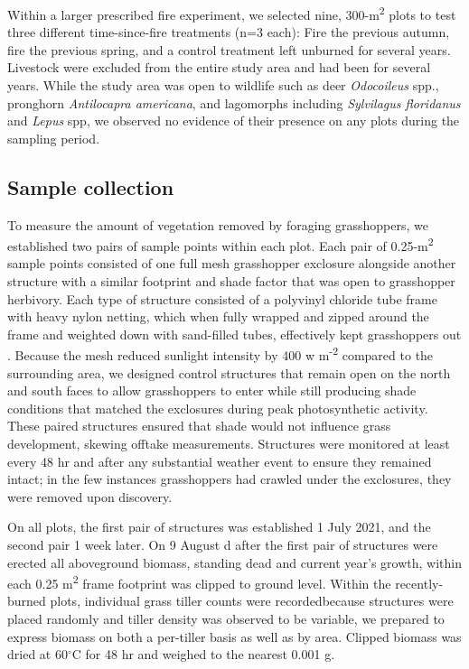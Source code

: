 \documentclass[referee, 
	            sn-basic]
           {sn-jnl}
\begin{document}
\begin{linenumbers}
Within a larger prescribed fire experiment, we selected nine, 300-m\textsuperscript{2} plots to test three different time-since-fire treatments (n=3 each): Fire the previous autumn, fire the previous spring, and a control treatment left unburned for several years. 
Livestock were excluded from the entire study area and had been for several years.
While the study area was open to wildlife such as deer \emph{Odocoileus} spp., pronghorn \emph{Antilocapra americana}, and lagomorphs including \emph{Sylvilagus floridanus} and \emph{Lepus} spp, we observed no evidence of their presence on any plots during the sampling period. 

\subsection{Sample collection}

To measure the amount of vegetation removed by foraging grasshoppers, we established two pairs of sample points within each plot. 
Each pair of 0.25-m\textsuperscript{2} sample points consisted of one full mesh grasshopper exclosure alongside another structure with a similar footprint and shade factor that was open to grasshopper herbivory.
Each type of structure consisted of a polyvinyl chloride tube frame with heavy nylon netting, which when fully wrapped and zipped around the frame and weighted down with sand-filled tubes, effectively kept grasshoppers out \citep{parker1985}. 
Because the mesh reduced sunlight intensity by 400 w m\textsuperscript{-2} compared to the
surrounding area, we designed control structures that remain open on the north and south faces to allow grasshoppers to enter while still producing shade conditions that matched the exclosures during peak photosynthetic activity. 
These paired structures ensured that shade would not influence grass development, skewing offtake measurements. 
Structures were monitored at least every 48 hr and after any substantial weather event to ensure they remained intact; in the few instances grasshoppers had crawled under the exclosures, they were removed upon discovery. 

On all plots, the first pair of structures was established 1 July 2021, and the second pair 1 week later. 
On 9 August d after the first pair of structures were erected\textemdash 
all aboveground biomass, standing dead and current year's growth, within each 0.25 m\textsuperscript{2} frame footprint was clipped to ground level.
Within the recently-burned plots, individual grass tiller counts were recorded\textemdash because structures were placed randomly and tiller density was observed to be variable, we prepared to express biomass on both a per-tiller basis as well as by area. 
Clipped biomass was dried at 60$^\circ$C for 48 hr and weighed to the nearest 0.001 g. 


\end{linenumbers}
\end{document}
